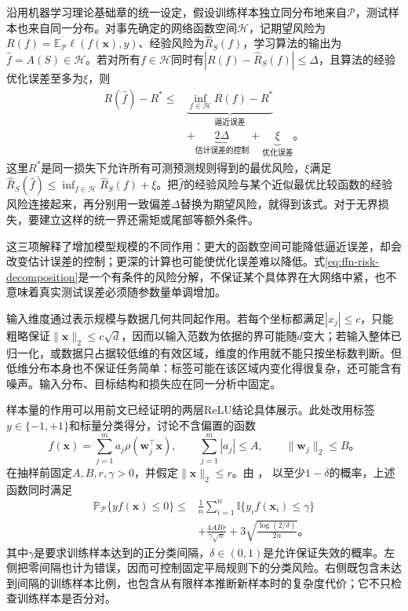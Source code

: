 沿用机器学习理论基础章的统一设定，假设训练样本独立同分布地来自$\mathcal{P}$，测试样本也来自同一分布。对事先确定的网络函数空间$\mathcal{H}$，记期望风险为$R(f)=\mathbb{E}_{\mathcal{P}}\ell(f(\bm{x}),y)$、经验风险为$\widehat R_S(f)$，学习算法的输出为$\widehat f=A(S)\in\mathcal{H}$。若对所有$f\in\mathcal{H}$同时有$|R(f)-\widehat R_S(f)|\leq\Delta$，且算法的经验优化误差至多为$\xi$，则
\begin{equation}
  \begin{aligned}
    R(\widehat f)-R^*\leq{}&
    \underbrace{\inf_{f\in\mathcal{H}}R(f)-R^*}_{\text{逼近误差}}\\
    &+\underbrace{2\Delta}_{\text{估计误差的控制}}
    +\underbrace{\xi}_{\text{优化误差}}\text{。}
  \end{aligned}
  \label{eq:ffn-risk-decomposition}
\end{equation}
这里$R^*$是同一损失下允许所有可测预测规则得到的最优风险，$\xi$满足$\widehat R_S(\widehat f)\leq\inf_{f\in\mathcal{H}}\widehat R_S(f)+\xi$。把$\widehat f$的经验风险与某个近似最优比较函数的经验风险连接起来，再分别用一致偏差$\Delta$替换为期望风险，就得到该式。对于无界损失，要建立这样的统一界还需矩或尾部等额外条件。

这三项解释了增加模型规模的不同作用：更大的函数空间可能降低逼近误差，却会改变估计误差的控制；更深的计算也可能使优化误差难以降低。式\eqref{eq:ffn-risk-decomposition}是一个有条件的风险分解，不保证某个具体界在大网络中紧，也不意味着真实测试误差必须随参数量单调增加。

输入维度通过表示规模与数据几何共同起作用。若每个坐标都满足$|x_j|\leq c$，只能粗略保证$\lVert\bm{x}\rVert_2\leq c\sqrt d$，因而以输入范数为依据的界可能随$d$变大；若输入整体已归一化，或数据只占据较低维的有效区域，维度的作用就不能只按坐标数判断。但低维分布本身也不保证任务简单：标签可能在该区域内变化得很复杂，还可能含有噪声。输入分布、目标结构和损失应在同一分析中固定。

样本量的作用可以用前文已经证明的两层ReLU结论具体展示。此处改用标签$y\in\{-1,+1\}$和标量分类得分，讨论不含偏置的函数
\[
  f(\bm{x})=\sum_{j=1}^{m}a_j\rho(\bm{w}_j^{\top}\bm{x}),
  \qquad \sum_{j=1}^{m}|a_j|\leq A,
  \qquad \lVert\bm{w}_j\rVert_2\leq B\text{。}
\]
在抽样前固定$A,B,r,\gamma>0$，并假定$\lVert\bm{x}\rVert_2\leq r$。由
，
以至少$1-\delta$的概率，上述函数同时满足
\begin{equation}
  \begin{aligned}
    \mathbb{P}_{\mathcal{P}}\{yf(\bm{x})\leq0\}
    \leq{}&\frac1n\sum_{i=1}^{n}
      \mathbb{I}\{y_i f(\bm{x}_i)\leq\gamma\}\\
    &+\frac{4ABr}{\gamma\sqrt n}
      +3\sqrt{\frac{\log(2/\delta)}{2n}}\text{。}
  \end{aligned}
  \label{eq:ffn-margin-risk}
\end{equation}
其中$\gamma$是要求训练样本达到的正分类间隔，$\delta\in(0,1)$是允许保证失效的概率。左侧把零间隔也计为错误，因而可控制固定平局规则下的分类风险。右侧既包含未达到间隔的训练样本比例，也包含从有限样本推断新样本时的复杂度代价；它不只检查训练样本是否分对。

